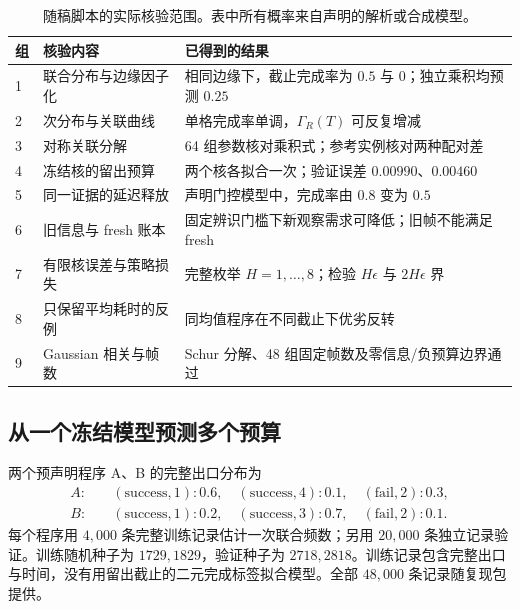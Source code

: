 \documentclass[11pt,a4paper,fontset=fandol]{ctexart}
\theoremstyle{definition}
\theoremstyle{remark}
\numberwithin{equation}{section}
\begin{document}
\begin{table}[htbp]\centering\small
\begin{tabularx}{\linewidth}{P{.08\linewidth}P{.28\linewidth}Y}
\toprule
组 & 核验内容 & 已得到的结果\\  & 联合分布与边缘因子化 & 相同边缘下，截止完成率为 $0.5$ 与 $0$；独立乘积均预测 $0.25$\\
2 & 次分布与关联曲线 & 单格完成率单调，$\Gamma_R(T)$ 可反复增减\\
3 & 对称关联分解 & 64 组参数核对乘积式；参考实例核对两种配对差\\
4 & 冻结核的留出预算 & 两个核各拟合一次；验证误差 $0.00990$、$0.00460$\\
5 & 同一证据的延迟释放 & 声明门控模型中，完成率由 $0.8$ 变为 $0.5$\\
6 & 旧信息与 fresh 账本 & 固定辨识门槛下新观察需求可降低；旧帧不能满足 fresh\\
7 & 有限核误差与策略损失 & 完整枚举 $H=1,\ldots,8$；检验 $H\epsilon$ 与 $2H\epsilon$ 界\\
8 & 只保留平均耗时的反例 & 同均值程序在不同截止下优劣反转\\
9 & Gaussian 相关与帧数 & Schur 分解、48 组固定帧数及零信息/负预算边界通过\\
\bottomrule
\end{tabularx}
\caption{随稿脚本的实际核验范围。表中所有概率来自声明的解析或合成模型。}
\end{table}

\subsection{从一个冻结模型预测多个预算}
两个预声明程序 A、B 的完整出口分布为
\begin{align}
 A:&\quad (\mathrm{success},1):0.6,\quad
 (\mathrm{success},4):0.1,\quad(\mathrm{fail},2):0.3,\\
 B:&\quad (\mathrm{success},1):0.2,\quad
 (\mathrm{success},3):0.7,\quad(\mathrm{fail},2):0.1.
\end{align}
每个程序用 $4{,}000$ 条完整训练记录估计一次联合频数；另用 $20{,}000$ 条独立记录验证。训练随机种子为 $1729,1829$，验证种子为 $2718,2818$。训练记录包含完整出口与时间，没有用留出截止的二元完成标签拟合模型。全部 $48{,}000$ 条记录随复现包提供。
\end{document}
